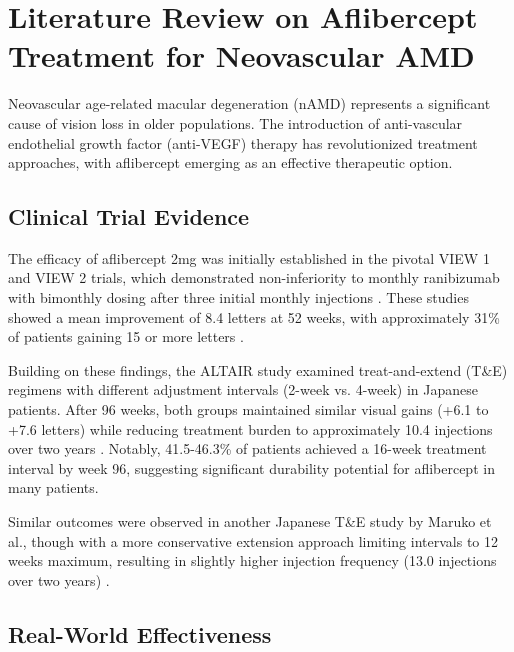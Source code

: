
\section{Literature Review on Aflibercept Treatment for Neovascular AMD}

Neovascular age-related macular degeneration (nAMD) represents a significant cause of vision loss in older populations. The introduction of anti-vascular endothelial growth factor (anti-VEGF) therapy has revolutionized treatment approaches, with aflibercept emerging as an effective therapeutic option.

\subsection{Clinical Trial Evidence}

The efficacy of aflibercept 2mg was initially established in the pivotal VIEW 1 and VIEW 2 trials, which demonstrated non-inferiority to monthly ranibizumab with bimonthly dosing after three initial monthly injections \citep{heierIntravitrealAfliberceptVEGF2012, schmidt-erfurthIntravitrealAfliberceptInjection2014}. These studies showed a mean improvement of 8.4 letters at 52 weeks, with approximately 31\% of patients gaining 15 or more letters \citep{heierIntravitrealAfliberceptVEGF2012}.

Building on these findings, the ALTAIR study examined treat-and-extend (T\&E) regimens with different adjustment intervals (2-week vs. 4-week) in Japanese patients. After 96 weeks, both groups maintained similar visual gains (+6.1 to +7.6 letters) while reducing treatment burden to approximately 10.4 injections over two years \citep{ohjiEfficacySafetyIntravitreal2020}. Notably, 41.5-46.3\% of patients achieved a 16-week treatment interval by week 96, suggesting significant durability potential for aflibercept in many patients.

Similar outcomes were observed in another Japanese T\&E study by Maruko et al., though with a more conservative extension approach limiting intervals to 12 weeks maximum, resulting in slightly higher injection frequency (13.0 injections over two years) \citep{marukoTwoYearOutcomesTreatandExtend2020}.

\subsection{Real-World Effectiveness}

